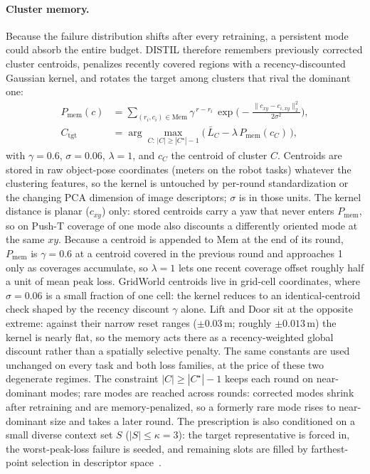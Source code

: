 \documentclass[letterpaper]{article} %
\begin{document}
\paragraph{Cluster memory.}
Because the failure distribution shifts after every retraining, a persistent
mode could absorb the entire budget. DISTIL therefore remembers previously
corrected cluster centroids, penalizes recently covered regions with a
recency-discounted Gaussian kernel, and rotates the target among clusters
that rival the dominant one:
\begin{align}
P_{\mathrm{mem}}(c)&=
\sum_{(r_i,c_i)\in\mathrm{Mem}}
\gamma^{\,r-r_i}\,
\exp\!\Big(-\tfrac{\|c_{xy}-c_{i,xy}\|_2^2}{2\sigma^2}\Big),
\nonumber\\
C_{\mathrm{tgt}}&=\arg\max_{C:\,|C|\ge|C^\star|-1}
\big(\,\bar L_C-\lambda\,P_{\mathrm{mem}}(c_C)\,\big),
\label{eq:memory}
\end{align}
with $\gamma{=}0.6$, $\sigma{=}0.06$, $\lambda{=}1$, and $c_C$ the centroid
of cluster $C$. Centroids are stored in raw object-pose coordinates (meters
on the robot tasks) whatever the clustering features, so the kernel is
untouched by per-round standardization or the changing PCA dimension of
image descriptors; $\sigma$ is in those units. The kernel distance is
planar ($c_{xy}$) only: stored centroids carry a yaw that never enters
$P_{\mathrm{mem}}$, so on Push-T coverage of one mode also discounts a
differently oriented mode at the same $xy$. Because a centroid is
appended to $\mathrm{Mem}$ at the end of its round, $P_{\mathrm{mem}}$ is
$\gamma=0.6$ at a centroid covered in the previous round and approaches 1
only as coverages accumulate, so $\lambda{=}1$ lets one recent coverage
offset roughly half a unit of mean peak loss. GridWorld centroids live in
grid-cell coordinates, where $\sigma{=}0.06$ is a small fraction of one
cell: the kernel reduces to an identical-centroid check shaped by the
recency discount $\gamma$ alone. Lift and Door sit at the opposite
extreme: against their narrow reset ranges ($\pm 0.03$\,m; roughly
$\pm 0.013$\,m) the kernel is nearly flat, so the memory acts there as a
recency-weighted global discount rather than a spatially selective
penalty. The same constants are used unchanged on every task and both
loss families, at the price of these two degenerate regimes. The constraint
$|C|\ge|C^\star|-1$ keeps each round on near-dominant modes; rare modes are
reached across rounds: corrected modes shrink after retraining and are
memory-penalized, so a formerly rare mode rises to near-dominant size and
takes a later round. The prescription is
also conditioned on a small diverse context set $S$
($|S|\le\kappa{=}3$): the target representative is forced in, the
worst-peak-loss failure is seeded, and remaining slots are filled by
farthest-point selection in descriptor
space~\citep{sener2018coreset,eldar1997fps}.
\end{document}
